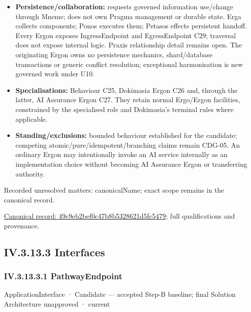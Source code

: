 \begin{itemize}
\item \textbf{Persistence/collaboration:} requests governed information use/change through
  Mneme; does not own Pragma management or durable state. Erga collects components;
  Ponos executes them; Petasos effects persistent handoff. Every Ergon exposes
  IngressEndpoint and EgressEndpoint C29; traversal does not expose internal logic.
  Praxis relationship detail remains open. The originating Ergon owns no persistence
  mechanics, shard/database transactions or generic conflict resolution; exceptional
  harmonisation is new governed work under U10.

\item \textbf{Specialisations:} Behaviour C25, Dokimasia Ergon C26 and, through the latter,
  AI Assurance Ergon C27. They retain normal Ergo/Ergon facilities, constrained
  by the specialised role and Dokimasia's terminal rules where applicable.

\item \textbf{Standing/exclusions:} bounded behaviour established for the candidate;
  competing atomic/pure/idempotent/branching claims remain CDG-05. An ordinary
  Ergon may intentionally invoke an AI service internally as an implementation
  choice without becoming AI Assurance Ergon or transferring authority.

\end{itemize}

{\small Recorded unresolved matters: canonicalName; exact scope remains in the canonical record.}\par
{\footnotesize \href{../../../../../../../../continuum/application/application-component/49c9eb2bef0c47b8b5328621d5fc5479.md}{Canonical record: 49c9eb2bef0c47b8b5328621d5fc5479}; full qualifications and provenance.}\par
\subsection*{IV.3.13.3 Interfaces}
\label{navigation:IV.3.13.3}

\subsubsection*{IV.3.13.3.1 PathwayEndpoint}
\label{navigation:IV.3.13.3.1}

\label{element:800789f54ba24f53a354600d5cd43f6f}
{\small ApplicationInterface · Candidate — accepted Step-B baseline; final Solution Architecture unapproved · current}\par

